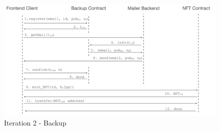\documentclass[runningheads]{llncs}
\begin{document}
\begin{figure}[t]
  \includegraphics[width=\linewidth]{./media/media-003.png}
  \caption{Iteration 2 - Backup}
  \label{it2:backup}
\end{figure}
\end{document}
